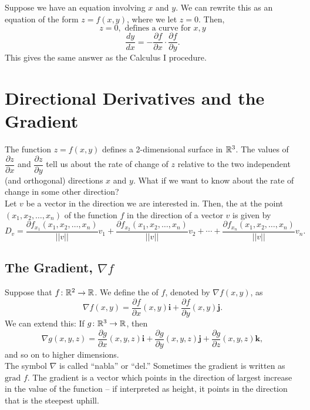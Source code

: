 Suppose we have an equation involving \(x\) and \(y\). We can rewrite this as an equation of the form \(z = f(x, y)\), where we let \(z = 0\). Then,
\[
z = 0, \text{ defines a curve for } x, y
\]
\[
\dfrac{dy}{dx} = -\dfrac{\partial f}{\partial x} \cdot \dfrac{\partial f}{\partial y}.
\]
This gives the same answer as the Calculus I  procedure.    

\newpage

\section{Directional Derivatives and the Gradient}

The function \(z = f(x, y)\) defines a 2-dimensional surface in \(\mathbb{R}^{3}\). The values of \(\dfrac{\partial z}{\partial x}\) and \(\dfrac{\partial z}{\partial y}\) tell us about the rate of change of \(z\) relative to the two independent (and orthogonal) directions \(x\) and \(y\). What if we want to know about the rate of change in some other direction? \\

Let \(v\) be a vector in the direction we are interested in. Then, the  at the point \((x_{1}, x_{2}, \ldots, x_{n})\) of the function \(f\) in the direction of a vector \(v\) is given by
\[
D_{v} = \dfrac{\partial f_{x_{1}}(x_{1}, x_{2}, \ldots, x_{n})}{||v||}v_{1} + \dfrac{\partial f_{x_{2}}(x_{1}, x_{2}, \ldots, x_{n})}{||v||}v_{2} + \cdots + \dfrac{\partial f_{x_{n}}(x_{1}, x_{2}, \ldots, x_{n})}{||v||}v_{n}.
\]
\subsection{The Gradient, \(\nabla f\)}

Suppose that \(f \colon \mathbb{R}^{2} \to \mathbb{R}\). We define the  of \(f\), denoted by \(\nabla f(x, y)\), as
\[
\nabla f(x, y) = \dfrac{\partial f}{\partial x}(x, y)\mathbf{i} + \dfrac{\partial f}{\partial y}(x, y)\mathbf{j}.
\]
We can extend this: If \(g \colon \mathbb{R}^{3} \to \mathbb{R}\), then
\[
\nabla g(x, y, z) = \dfrac{\partial g}{\partial x}(x, y, z)\mathbf{i} + \dfrac{\partial g}{\partial y}(x, y, z)\mathbf{j} + \dfrac{\partial g}{\partial z}(x, y, z)\mathbf{k},
\]
and so on to higher dimensions. \\

The symbol \(\nabla\) is called “nabla” or “del.” Sometimes the gradient is written as \(\text{grad } f\). The gradient is a vector which points in the direction of largest increase in the value of the function – if interpreted as height, it points in the direction that is the steepest uphill. \\


